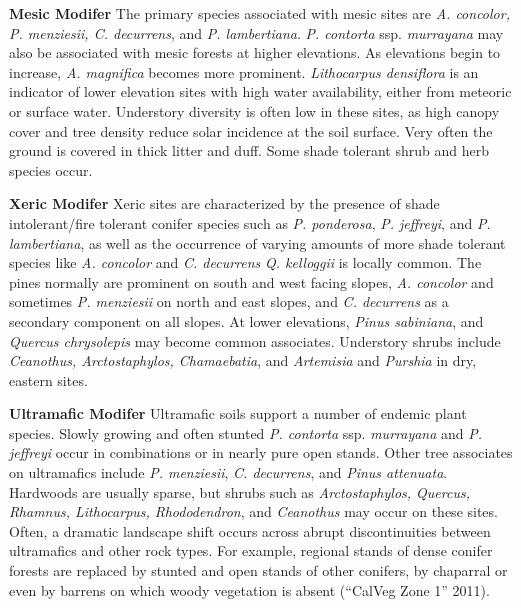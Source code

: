 \begin{adjustwidth}{2cm}{}
\textbf{Mesic Modifer } The primary species associated with mesic sites are \emph{A. concolor, P. menziesii, C. decurrens}, and \emph{P. lambertiana}. \emph{P. contorta} ssp. \emph{murrayana} may also be associated with mesic forests at higher elevations. As elevations begin to increase, \emph{A. magnifica} becomes more prominent. \emph{Lithocarpus densiflora} is an indicator of lower elevation sites with high water availability, either from meteoric or surface water. Understory diversity is often low in these sites, as high canopy cover and tree density reduce solar incidence at the soil surface. Very often the ground is covered in thick litter and duff. Some shade tolerant shrub and herb species occur.

\textbf{Xeric Modifer}  Xeric sites are characterized by the presence of shade intolerant/fire tolerant conifer species such as \emph{P. ponderosa}, \emph{P. jeffreyi}, and \emph{P. lambertiana}, as well as the occurrence of varying amounts of more shade tolerant species like \emph{A. concolor} and \emph{C. decurrens}  \emph{Q. kelloggii} is locally common. The pines normally are prominent on south and west facing slopes, \emph{A. concolor} and sometimes \emph{P. menziesii}  on north and east slopes, and \emph{C. decurrens} as a secondary component on all slopes. At lower elevations, \emph{Pinus sabiniana}, and \emph{Quercus chrysolepis} may become common associates. Understory shrubs include \emph{Ceanothus, Arctostaphylos, Chamaebatia}, and \emph{Artemisia} and \emph{Purshia} in dry, eastern sites.

\textbf{Ultramafic Modifer} Ultramafic soils support a number of endemic plant species. Slowly growing and often stunted \emph{P. contorta} ssp. \emph{murrayana} and \emph{P. jeffreyi} occur in combinations or in nearly pure open stands. Other tree associates on ultramafics include \emph{P. menziesii}, \emph{C. decurrens}, and \emph{Pinus attenuata}. Hardwoods are usually sparse, but shrubs such as \emph{Arctostaphylos, Quercus, Rhamnus, Lithocarpus, Rhododendron}, and \emph{Ceanothus} may occur on these sites. Often, a dramatic landscape shift occurs across abrupt discontinuities between ultramafics and other rock types. For example, regional stands of dense conifer forests are replaced by stunted and open stands of other conifers, by chaparral or even by barrens on which woody vegetation is absent (``CalVeg Zone 1'' 2011).

\end{adjustwidth}

